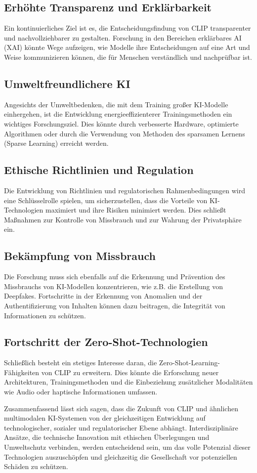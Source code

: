 \documentclass[nolibertine, ngerman, algorithm, nomencl, minted]{ttlab-qualify}
\begin{document}
\subsection{Erhöhte Transparenz und Erklärbarkeit}
Ein kontinuierliches Ziel ist es, die Entscheidungsfindung von CLIP transparenter und nachvollziehbarer zu gestalten. Forschung in den 
Bereichen erklärbares AI (XAI) könnte Wege aufzeigen, wie Modelle ihre Entscheidungen auf eine Art und Weise kommunizieren können, die für 
Menschen verständlich und nachprüfbar ist.

\subsection{Umweltfreundlichere KI}
Angesichts der Umweltbedenken, die mit dem Training großer KI-Modelle einhergehen, ist die Entwicklung energieeffizienterer Trainingsmethoden 
ein wichtiges Forschungsziel. Dies könnte durch verbesserte Hardware, optimierte Algorithmen oder durch die Verwendung von Methoden des sparsamen 
Lernens (Sparse Learning) erreicht werden.

\subsection{Ethische Richtlinien und Regulation}
Die Entwicklung von Richtlinien und regulatorischen Rahmenbedingungen wird eine Schlüsselrolle spielen, um sicherzustellen, dass die Vorteile 
von KI-Technologien maximiert und ihre Risiken minimiert werden. Dies schließt Maßnahmen zur Kontrolle von Missbrauch und zur Wahrung der Privatsphäre ein.

\subsection{Bekämpfung von Missbrauch}
Die Forschung muss sich ebenfalls auf die Erkennung und Prävention des Missbrauchs von KI-Modellen konzentrieren, wie z.B. die Erstellung von 
Deepfakes. Fortschritte in der Erkennung von Anomalien und der Authentifizierung von Inhalten können dazu beitragen, die Integrität von Informationen zu schützen.

\subsection{Fortschritt der Zero-Shot-Technologien}
Schließlich besteht ein stetiges Interesse daran, die Zero-Shot-Learning-Fähigkeiten von CLIP zu erweitern. Dies könnte die Erforschung neuer 
Architekturen, Trainingsmethoden und die Einbeziehung zusätzlicher Modalitäten wie Audio oder haptische Informationen umfassen.

Zusammenfassend lässt sich sagen, dass die Zukunft von CLIP und ähnlichen multimodalen KI-Systemen von der gleichzeitigen Entwicklung auf 
technologischer, sozialer und regulatorischer Ebene abhängt. Interdisziplinäre Ansätze, die technische Innovation mit ethischen Überlegungen 
und Umweltschutz verbinden, werden entscheidend sein, um das volle Potenzial dieser Technologien auszuschöpfen und gleichzeitig die Gesellschaft 
vor potenziellen Schäden zu schützen.

\printbibliography
\end{document}

